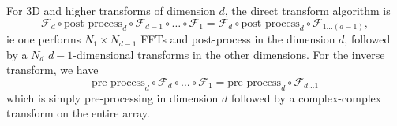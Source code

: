 \documentclass[12pt]{article}
\newcommand{\Four}{\mathcal{F}}
\renewcommand{\(}{\left(}
\renewcommand{\)}{\right)}
\begin{document}
For 3D and higher transforms of dimension $d$, the direct transform
algorithm is
\begin{dmath}
  \Four_{d} \circ \text{post-process}_d
  \circ \Four_{d-1} \circ \dots \circ \Four_1
  =
  \Four_{d} \circ \text{post-process}_d  \circ \Four_{1 \dots (d-1)},
\end{dmath}
ie one performs $N_1\times{}N_{d-1}$ FFTs and post-process in the
dimension $d$, followed by a $N_d$ $d-1$-dimensional transforms in the
other dimensions.  For the inverse transform, we have
\begin{dmath}
  \text{pre-process}_d \circ \Four_d \circ \dots \circ \Four_1
  =
  \text{pre-process}_d \circ \Four_{d\dots{}1}
\end{dmath}
which is simply pre-processing in dimension $d$ followed by a
complex-complex transform on the entire array.
\end{document}
